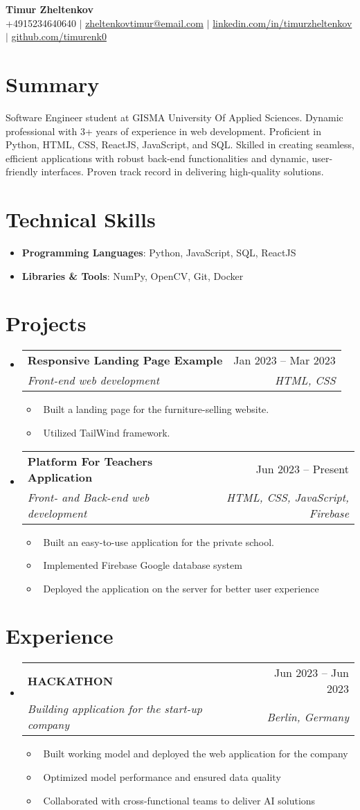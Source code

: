\documentclass[letterpaper,10pt]{article}
\makeatletter
\newcommand{\resumeItem}[1]{\item\small{#1}}
\newcommand{\resumeSubheading}[4]{
\vspace{-1pt}\item
  \begin{tabular*}{0.97\textwidth}[t]{l@{\extracolsep{\fill}}r}
    \textbf{#1} & #2 \\
    \textit{#3} & \textit{#4} \\
  \end{tabular*}\vspace{-7pt}
}
\newcommand{\resumeSubHeadingList}{\begin{itemize}[leftmargin=0.15in, label={}]}
\newcommand{\resumeSubHeadingListEnd}{\end{itemize}}
\makeatother
\begin{document}
\begin{center}
  \textbf{\Huge Timur Zheltenkov} \\
  \small +4915234640640 $|$ \href{mailto:alex@email.com}{zheltenkovtimur@email.com} $|$ 
  \href{https://linkedin.com/in/burhan-webb}{linkedin.com/in/timurzheltenkov} $|$
  \href{https://github.com/zwayth}{github.com/timurenk0}
\end{center}

\section*{Summary}
Software Engineer student at GISMA University Of Applied Sciences. Dynamic professional with 3+ years of experience in web development. Proficient in Python, HTML, CSS, ReactJS, JavaScript, and SQL. Skilled in creating seamless, efficient applications with robust back-end functionalities and dynamic, user-friendly interfaces. Proven track record in delivering high-quality solutions.

\section{Technical Skills}
\resumeSubHeadingList
  \resumeItem{\textbf{Programming Languages}: Python, JavaScript, SQL, ReactJS}
  \resumeItem{\textbf{Libraries \& Tools}: NumPy, OpenCV, Git, Docker}
\resumeSubHeadingListEnd

\section{Projects}
\resumeSubHeadingList
  \resumeSubheading
      {Responsive Landing Page Example}{Jan 2023 -- Mar 2023}
      {Front-end web development}{HTML, CSS}
      \resumeSubHeadingList
          \resumeItem{\textbullet\ Built a landing page for the furniture-selling website.}
          \resumeItem{\textbullet\ Utilized TailWind framework.}
      \resumeSubHeadingListEnd
  \resumeSubheading
      {Platform For Teachers Application}{Jun 2023 -- Present} 
      {Front- and Back-end web development}{HTML, CSS, JavaScript, Firebase}
      \resumeSubHeadingList
          \resumeItem{\textbullet\ Built an easy-to-use application for the private school.}
          \resumeItem{\textbullet\ Implemented Firebase Google database system}
          \resumeItem{\textbullet\ Deployed the application on the server for better user experience}
      \resumeSubHeadingListEnd
\resumeSubHeadingListEnd

\section{Experience}
\resumeSubHeadingList
  \resumeSubheading
      {HACKATHON}{Jun 2023 -- Jun 2023}
      {Building application for the start-up company}{Berlin, Germany}
      \resumeSubHeadingList
          \resumeItem{\textbullet\ Built working model and deployed the web application for the company}
          \resumeItem{\textbullet\ Optimized model performance and ensured data quality}
          \resumeItem{\textbullet\ Collaborated with cross-functional teams to deliver AI solutions}
      \resumeSubHeadingListEnd
\resumeSubHeadingListEnd
\end{document}
